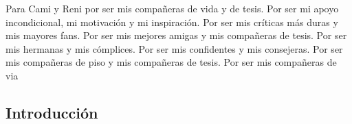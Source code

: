 \documentclass[
]{article}
\renewcommand*\contentsname{Table of contents}
\newcommand\contentsname{Table of contents}
\begin{document}
\newpage
    \begin{center}
        Para Cami y Reni por ser mis compañeras de vida y de tesis. Por ser mi apoyo incondicional, mi motivación y mi inspiración. Por ser mis críticas más duras y mis mayores fans. Por ser mis mejores amigas y mis compañeras de tesis. Por ser mis hermanas y mis cómplices. Por ser mis confidentes y mis consejeras. Por ser mis compañeras de piso y mis compañeras de tesis. Por ser mis compañeras de via
    \end{center}

\newpage
\begin{center}
\end{center}

\newpage



\newpage
\tableofcontents
\renewcommand*\contentsname{Table of contents}
{
\hypersetup{linkcolor=}
\setcounter{tocdepth}{3}
\tableofcontents
}
\subsection{Introducción}\label{sec-intro}
\end{document}
